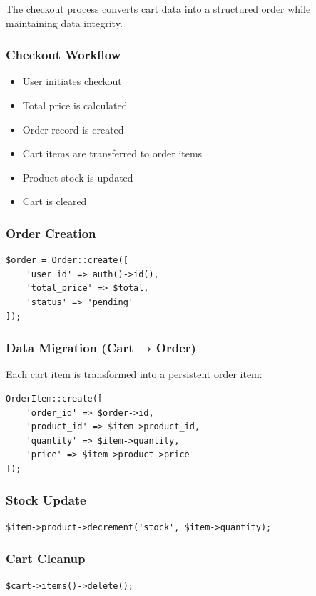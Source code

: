 \documentclass[12pt,a4paper]{article}
\begin{document}
The checkout process converts cart data into a structured order while maintaining data integrity.

\subsubsection{Checkout Workflow}
\begin{itemize}[noitemsep]
    \item User initiates checkout
    \item Total price is calculated
    \item Order record is created
    \item Cart items are transferred to order items
    \item Product stock is updated
    \item Cart is cleared
\end{itemize}

\subsubsection{Order Creation}
\begin{verbatim}
$order = Order::create([
    'user_id' => auth()->id(),
    'total_price' => $total,
    'status' => 'pending'
]);
\end{verbatim}

\subsubsection{Data Migration (Cart → Order)}
Each cart item is transformed into a persistent order item:

\begin{verbatim}
OrderItem::create([
    'order_id' => $order->id,
    'product_id' => $item->product_id,
    'quantity' => $item->quantity,
    'price' => $item->product->price
]);
\end{verbatim}

\subsubsection{Stock Update}
\begin{verbatim}
$item->product->decrement('stock', $item->quantity);
\end{verbatim}

\subsubsection{Cart Cleanup}
\begin{verbatim}
$cart->items()->delete();
\end{verbatim}
\end{document}

